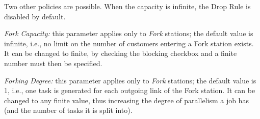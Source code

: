 \begin{itemize*}
Two other policies are possible. When the capacity is infinite,
the Drop Rule is disabled by default. \item \emph{Fork Capacity:}
this parameter applies only to \emph{Fork} stations; the default
value is infinite, i.e., no limit on the number of customers
entering a Fork station exists. It can be changed to finite, by
checking the blocking checkbox and a finite number must then be
specified. \item \emph{Forking Degree:} this parameter applies
only to \emph{Fork} stations; the default value is 1, i.e., one
task is generated for each outgoing link of the Fork station. It
can be changed to any finite value, thus increasing the degree of
parallelism a job has
(and the number of tasks it is split into).\\
\end{itemize*}

